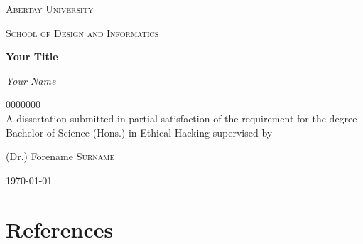 \documentclass[12pt,a4paper]{article}
\begin{document}
    \begin{titlepage}
      \centering
		{\scshape\LARGE Abertay University \par} %
		\vspace{1cm}
		{\scshape School of Design and Informatics \par}
		\vspace{1.5cm}
		{\Large\bfseries Your Title\par}
		\vspace{4cm}
		{\Large\itshape Your Name\par}
		0000000 %
		\\
		\vfill
		A dissertation submitted in partial satisfaction of the requirement for the degree Bachelor of Science (Hons.) in Ethical Hacking
		\vfill
		supervised by\par
		(Dr.) Forename \textsc{Surname}
		\vfill
		{\large \today\par}  
    \end{titlepage}

    
        
    \tableofcontents
    \clearpage
    \listoffigures
    \clearpage

    
    
    
    
    
    

    \section{References}
        \printbibliography[heading=none]

    
\end{document}
